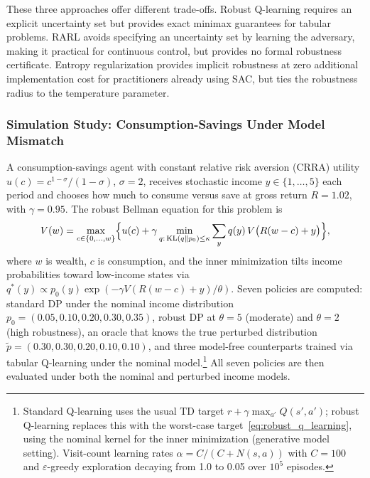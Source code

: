 These three approaches offer different trade-offs. Robust Q-learning
requires an explicit uncertainty set but provides exact minimax guarantees
for tabular problems. RARL avoids specifying an uncertainty set by learning
the adversary, making it practical for continuous control, but provides no
formal robustness certificate. Entropy regularization provides implicit
robustness at zero additional implementation cost for practitioners already
using SAC, but ties the robustness radius to the temperature parameter.

\subsubsection{Simulation Study: Consumption-Savings Under Model Mismatch}
\label{subsec:sim_robust_consumption}

A consumption-savings agent with constant relative risk aversion (CRRA) utility
$u(c) = c^{1-\sigma}/(1-\sigma)$, $\sigma = 2$, receives stochastic
income $y \in \{1,\ldots,5\}$ each period and chooses how much to consume
versus save at gross return $R = 1.02$, with $\gamma = 0.95$. The robust
Bellman equation for this problem is
\begin{equation}
  V(w) = \max_{c \in \{0,\ldots,w\}} \Bigl\{
    u(c) + \gamma \min_{q:\,\text{KL}(q\|p_0) \leq \kappa}
    \sum_{y} q(y)\, V\bigl(R(w-c) + y\bigr)
  \Bigr\},
  \label{eq:robust_consumption}
\end{equation}
where $w$ is wealth, $c$ is consumption, and the inner minimization tilts
income probabilities toward low-income states via
$q^*(y) \propto p_0(y)\exp(-\gamma V(R(w-c)+y)/\theta)$. Seven policies
are computed: standard DP under the nominal income distribution
$p_0 = (0.05, 0.10, 0.20, 0.30, 0.35)$, robust DP at $\theta = 5$
(moderate) and $\theta = 2$ (high robustness), an oracle that knows the
true perturbed distribution
$\tilde{p} = (0.30, 0.30, 0.20, 0.10, 0.10)$, and three model-free
counterparts trained via tabular Q-learning under the nominal
model.\footnote{Standard Q-learning uses the usual TD target
$r + \gamma \max_{a'} Q(s',a')$; robust Q-learning replaces this with
the worst-case target~\eqref{eq:robust_q_learning}, using the nominal
kernel for the inner minimization (generative model setting).
Visit-count learning rates $\alpha = C/(C + N(s,a))$ with $C = 100$
and $\varepsilon$-greedy exploration decaying from 1.0 to 0.05 over
$10^5$ episodes.} All seven policies are then evaluated under both the
nominal and perturbed income models.

